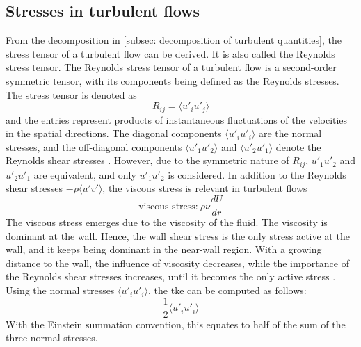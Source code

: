 \subsection{Stresses in turbulent flows}\label{subsec: stresses in turbulence}
From the decomposition in \autoref{subsec: decomposition of turbulent quantities}, the stress tensor of a turbulent flow can be derived.
It is also called the Reynolds stress tensor.
The Reynolds stress tensor of a turbulent flow is a second-order symmetric tensor, with its components being defined as the Reynolds stresses.
The stress tensor is denoted as 
\begin{equation} \label{eq: Reynolds stresses}
     R_{ij} = \langle u'_i u'_j \rangle
\end{equation}
and the entries represent products of instantaneous fluctuations of the velocities in the spatial directions.
The diagonal components $\langle u'_i u'_i\rangle$ are the normal stresses, and the off-diagonal components $\langle u'_1 u'_2 \rangle$ and $\langle u'_2u'_1 \rangle$ denote the Reynolds shear stresses \citep{popeTurbulentFlows2015}.
However, due to the symmetric nature of $R_{ij}$, $u'_1u'_2$ and $u'_2u'_1$ are equivalent, and only $u'_1u'_2$ is considered. 
In addition to the Reynolds shear stresses $-\rho \langle u' v' \rangle$, the viscous stress is relevant in turbulent flows
\begin{equation}\label{eq: viscous stress}
    \text{viscous stress:}\ \rho \nu \frac{dU}{dr}
\end{equation}
The viscous stress emerges due to the viscosity of the fluid.
The viscosity is dominant at the wall.
Hence, the wall shear stress is the only stress active at the wall, and it keeps being dominant in the near-wall region.
With a growing distance to the wall, the influence of viscosity decreases, while the importance of the Reynolds shear stresses increases, until it becomes the only active stress \citep{popeTurbulentFlows2015}.\\
Using the normal stresses $\langle u'_i u'_i\rangle$, the \acrshort{tke} can be computed as follows:
\begin{equation}\label{eq: TKE}
    \frac{1}{2} \langle u'_i u'_i\rangle
\end{equation}
With the Einstein summation convention, this equates to half of the sum of the three normal stresses. 
